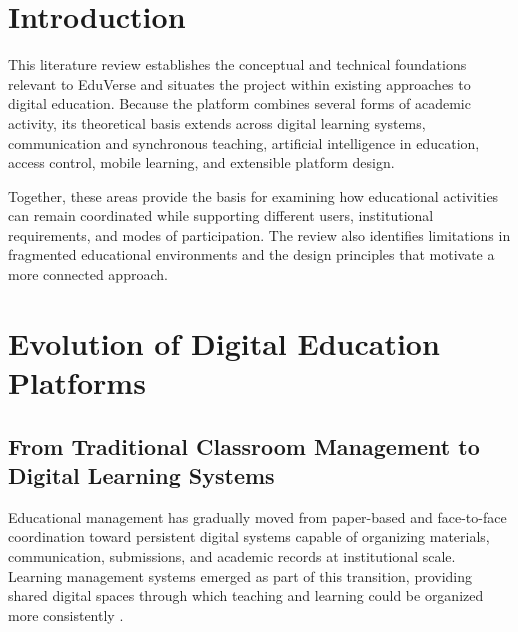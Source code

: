 
\section{Introduction}\label{sec:literature_review_introduction}

This literature review establishes the conceptual and technical foundations
relevant to EduVerse and situates the project within existing approaches to
digital education. Because the platform combines several forms of academic
activity, its theoretical basis extends across digital learning systems,
communication and synchronous teaching, artificial intelligence in education,
access control, mobile learning, and extensible platform design.

Together, these areas provide the basis for examining how educational
activities can remain coordinated while supporting different users,
institutional requirements, and modes of participation. The review also
identifies limitations in fragmented educational environments and the design
principles that motivate a more connected approach.

\section{Evolution of Digital Education Platforms}
\label{sec:evolution_of_digital_education_platforms}

\subsection{From Traditional Classroom Management to Digital Learning Systems}
\label{subsec:traditional_to_digital_learning_systems}

Educational management has gradually moved from paper-based and face-to-face
coordination toward persistent digital systems capable of organizing materials,
communication, submissions, and academic records at institutional scale.
Learning management systems emerged as part of this transition, providing
shared digital spaces through which teaching and learning could be organized
more consistently \cite{chugh2023edtech,bygstad2022digital}.

